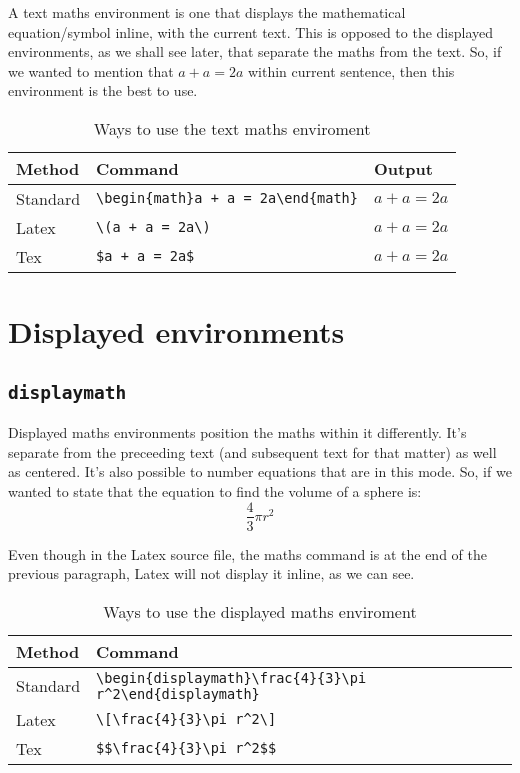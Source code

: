 

A text maths environment is one that displays the mathematical
equation/symbol inline, with the current text. This is opposed to the
displayed environments, as we shall see later, that separate the maths
from the text. So, if we wanted to mention that \(a + a = 2a\) within
current sentence, then this environment is the best to use.

\begin{table}[!htp]
\begin{tabular}{|l|l|l|}
\hline
  Method & Command & Output \\ \hline
  Standard & \verb|\begin{math}a + a = 2a\end{math}| & \begin{math}a + a = 2a\end{math} \\ \hline
  Latex & \verb|\(a + a = 2a\)| & \(a + a = 2a\) \\ \hline
  Tex & \verb|$a + a = 2a$| & $a + a = 2a$ \\ \hline
\end{tabular}
\caption{Ways to use the text maths enviroment}
\end{table}

\section{Displayed environments}

\subsection{\texttt{displaymath}}

Displayed maths environments position the maths within it differently.
It's separate from the preceeding text (and subsequent text for that
matter) as well as centered. It's also possible to number equations that
are in this mode. So, if we wanted to state that the equation to find
the volume of a sphere is: \[\frac{4}{3}\pi r^2\]

Even though in the Latex source file, the maths command is at the end of
the previous paragraph, Latex will not display it inline, as we can see.

\begin{table}[!htp]
\begin{tabular}{|l|l|l|}
\hline
  Method & Command \\ \hline
  Standard & \verb|\begin{displaymath}\frac{4}{3}\pi r^2\end{displaymath}| \\ \hline
  Latex & \verb|\[\frac{4}{3}\pi r^2\]| \\ \hline
  Tex & \verb|$$\frac{4}{3}\pi r^2$$| \\ \hline
\end{tabular}
\caption{Ways to use the displayed maths enviroment}
\end{table}

